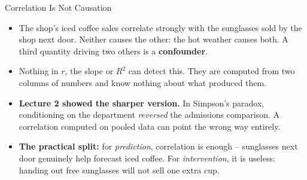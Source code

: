\begin{frame}{Correlation Is Not Causation}
\begin{itemize}
  \item The shop's iced coffee sales correlate strongly with the sunglasses sold by the shop next door. Neither causes the other: the hot weather causes both. A third quantity driving two others is a \textbf{confounder}.
  \pause
  \item Nothing in $r$, the slope or $R^2$ can detect this. They are computed from two columns of numbers and know nothing about what produced them.
  \pause
  \item \textbf{Lecture 2 showed the sharper version.} In Simpson's paradox, conditioning on the department \emph{reversed} the admissions comparison. A correlation computed on pooled data can point the wrong way entirely.
  \pause
  \item \textbf{The practical split:} for \emph{prediction}, correlation is enough -- sunglasses next door genuinely help forecast iced coffee. For \emph{intervention}, it is useless: handing out free sunglasses will not sell one extra cup.
\end{itemize}
\end{frame}
